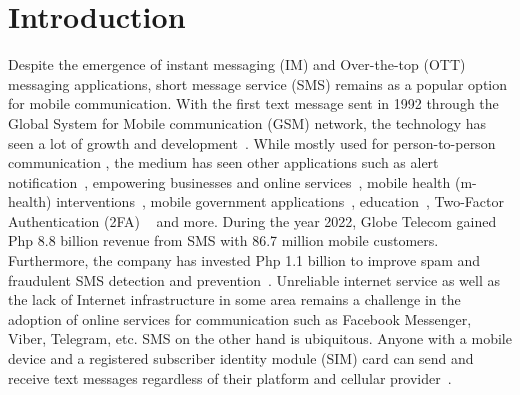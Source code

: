 \documentclass[journal]{./IEEE/IEEEtran}
\title{\SPTITLE}
\author{\ADVISEE~and~\ADVISER%
	\REMARK
}
\begin{document}
\maketitle



\section{Introduction}
Despite the emergence of instant messaging (IM) and Over-the-top (OTT)
messaging applications, short message service (SMS) remains as a popular option
for mobile communication. With the first text message sent in 1992 through the
Global System for Mobile communication (GSM) network, the technology has seen
a lot of growth and  development~\cite{LeBodic_2005}. While mostly used for
person-to-person communication \cite{Herring_Stein_Virtanen_2013}, the medium
has seen other applications such as alert notification~\cite{Yoo_Lee_Yoo_Xiao_2021,
	Azid_Sharma_Raghuwaiya_Chand_Prasad_Jacquier_2015},
empowering businesses and online services~\cite{Gargaro_2023, Okazaki_Taylor_2008,
	SecureSMS14}, mobile health (m-health) interventions~\cite{NudgeFlu23, SMSUx22},
mobile government applications~\cite{Onashoga_Ogunjobi_Ibharalu_Lawal_2016, EGov13},
education~\cite{Hill_Hill_Sherman_2007}, Two-Factor Authentication (2FA)
~\cite{DynamicOTP} and more. During the year 2022, Globe Telecom gained
Php 8.8 billion revenue from SMS with 86.7 million mobile customers.
Furthermore, the company has invested Php 1.1 billion to improve spam and
fraudulent SMS detection and prevention~\cite{GlobeIR22}. Unreliable internet
service as well as the lack of Internet infrastructure in some area remains a
challenge in the adoption of online services for communication such as
Facebook Messenger, Viber, Telegram, etc. SMS on the other hand is ubiquitous.
Anyone with a mobile device and a registered subscriber identity module (SIM)
card can send and receive text messages regardless of their platform and
cellular provider~\cite{PhilStar}.
\end{document}
